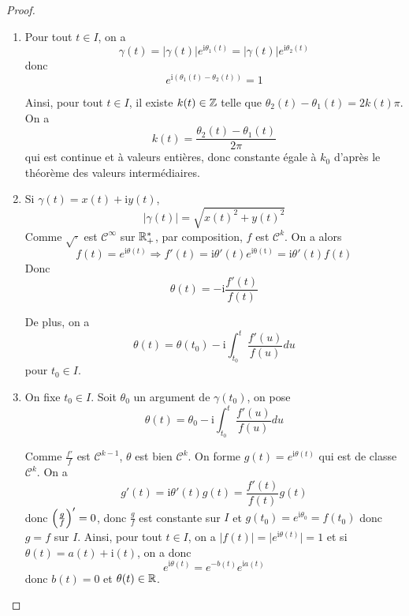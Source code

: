 \begin{proof}
	\phantom{}
	\begin{enumerate}
		\item Pour tout $t\in I$, on a 
		\begin{equation}\gamma(t)=\vert\gamma(t)\vert e^{\mathrm{i}\theta_{1}(t)}=\vert\gamma(t)\vert e^{\mathrm{i}\theta_{2}(t)}\end{equation}
		donc 
		\begin{equation}e^{\mathrm{i}(\theta_{1}(t)-\theta_{2}(t))}=1\end{equation}

		Ainsi, pour tout $t\in I$, il existe $k(t)\in\mathbb{Z}$ telle que $\theta_{2}(t)-\theta_{1}(t)=2k(t)\pi$. On a 
		\begin{equation}k(t)=\frac{\theta_{2}(t)-\theta_{1}(t)}{2\pi}\end{equation}
		qui est continue et à valeurs entières, donc constante égale à $k_{0}$ d'après le théorème des valeurs intermédiaires.

		\item Si $\gamma(t)=x(t)+\mathrm{i}y(t)$, 
		\begin{equation}\vert\gamma(t)\vert=\sqrt{x(t)^{2}+y(t)^{2}}\end{equation}
		Comme $\sqrt{\cdot}$ est $\mathcal{C}^{\infty}$ sur $\mathbb{R}_{+}^{*}$, par composition, $f$ est $\mathcal{C}^{k}$. On a alors
		\begin{equation}f(t)=e^{\mathrm{i}\theta(t)}\Rightarrow f'(t)=\mathrm{i}\theta'(t)e^{\mathrm{i\theta(t)}}=\mathrm{i}\theta'(t)f(t)\end{equation}
		Donc 
		\begin{equation}\theta(t)=-\mathrm{i}\frac{f'(t)}{f(t)}\end{equation}

		De plus, on a 
		\begin{equation}\theta(t)=\theta(t_{0})-\mathrm{i}\int_{t_{0}}^{t}\frac{f'(u)}{f(u)}du\end{equation}
		pour $t_{0}\in I$.

		\item On fixe $t_{0}\in I$. Soit $\theta_{0}$ un argument de $\gamma(t_{0})$, on pose 
		\begin{equation}\theta(t)=\theta_{0}-\mathrm{i}\int_{t_{0}}^{t}\frac{f'(u)}{f(u)}du\end{equation}
		
		Comme $\frac{f'}{f}$ est $\mathcal{C}^{k-1}$, $\theta$ est bien $\mathcal{C}^{k}$. On forme $g(t)=e^{\mathrm{i}\theta(t)}$ qui est de classe $\mathcal{C}^{k}$. On a 
		\begin{equation}g'(t)=\mathrm{i}\theta'(t)g(t)=\frac{f'(t)}{f(t)}g(t)\end{equation}
		donc $\Bigl(\frac{g}{f}\Bigr)'=0$, donc $\frac{g}{f}$ est constante sur $I$ et $g(t_{0})=e^{\mathrm{i}\theta_{0}}=f(t_{0})$ donc $g=f$ sur $I$. Ainsi, pour tout $t\in I$, on a $\vert f(t)\vert=\vert e^{\mathrm{i}\theta(t)}\vert=1$ et si $\theta(t)=a(t)+\mathrm{i}(t)$, on a donc 
		\begin{equation}e^{\mathrm{i}\theta(t)}=e^{-b(t)}e^{\mathrm{i}a(t)}\end{equation}
		donc $b(t)=0$ et $\theta(t)\in\mathbb{R}$.
	\end{enumerate}
\end{proof}